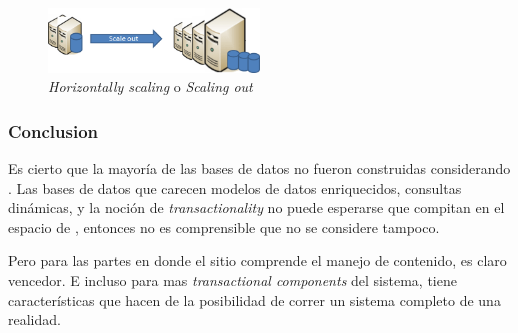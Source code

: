 \begin{figure}[h!]
	\centering
	\includegraphics[width=0.5\textwidth]{figuras/cap2/scale_out.png}
	\caption{\textit{Horizontally scaling} o \textit{Scaling out} }
	\label{figure:figure_scale_out}
\end{figure}

\subsubsection{Conclusion}

Es cierto que la mayoría de las bases de datos  no fueron construidas considerando \ecommerce. Las bases de datos que carecen modelos de datos enriquecidos, consultas dinámicas, y la noción de \textit{transactionality} no puede esperarse que compitan en el espacio de \ecommerce, entonces no es comprensible que no se considere \mongodb tampoco.

Pero para las partes en donde el sitio \ecommerce comprende el manejo de contenido, \mongodb es claro vencedor. E incluso para mas \textit{transactional components} del sistema, \mongodb tiene características que hacen de la posibilidad de correr un sistema completo de \ecommerce una realidad.


\section{\nodejs}\label{cap:section:nodejs}


